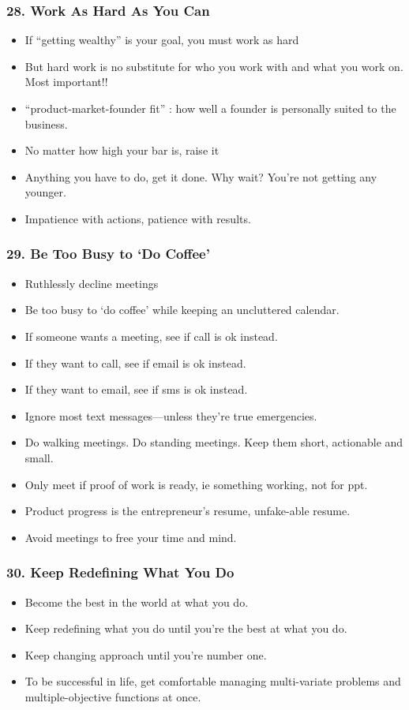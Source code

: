 \begin{frame}[fragile]
\frametitle{28. Work As Hard As You Can}
\begin{itemize}
\item If ``getting wealthy'' is your goal, you must work as hard 
\item But hard work is no substitute for who you work with and what you work on. Most important!!
\item  ``product-market-founder  fit'' : how well a founder is personally suited to the business.
\item No matter how high your bar is, raise it
\item Anything you have to do, get it done. Why wait? You're not getting any younger.
\item Impatience with actions, patience with results.
\end{itemize}
\end{frame}

\begin{frame}[fragile]
\frametitle{29. Be Too Busy to ‘Do Coffee'}
\begin{itemize}
\item Ruthlessly decline meetings
\item Be too busy to `do coffee' while keeping an uncluttered calendar.
\item If someone wants a meeting, see if call is ok instead. 
\item If they want to call, see if email is ok instead.
\item If they want to email, see if sms is ok instead.
\item  Ignore most text messages—unless they're true emergencies.
\item Do walking meetings. Do standing meetings. Keep them short, actionable and small. 
\item Only meet if proof of work is ready, ie something working, not for ppt.
\item  Product progress is the entrepreneur's resume, unfake-able resume.
\item Avoid meetings to free your time and mind.
\end{itemize}
\end{frame}

\begin{frame}[fragile]
\frametitle{30. Keep Redefining What You Do}
\begin{itemize}
\item Become the best in the world at what you do.
\item Keep redefining what you do until you're the best at what you do.
\item Keep changing approach until you're number one.
\item To be successful in life, get comfortable managing multi-variate problems
and multiple-objective functions at once. 
\end{itemize}
\end{frame}

